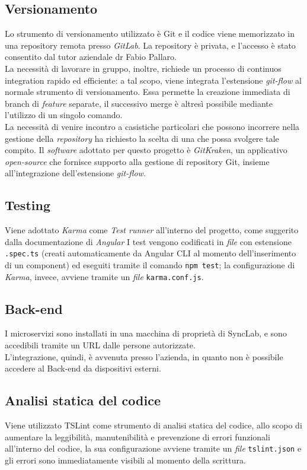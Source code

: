 \subsection{Versionamento}
Lo strumento di versionamento utilizzato è \gls{Git} e il codice viene memorizzato in una \gls{repository} remota presso \textit{GitLab}. La repository è privata, e l'accesso è stato consentito dal tutor aziendale dr Fabio Pallaro.\\
La necessità di lavorare in gruppo, inoltre, richiede un processo di \gls{continuos integration} rapido ed efficiente: a tal scopo, viene integrata l'estensione \textit{git-flow}  al normale strumento di versionamento. Essa permette la creazione immediata di \gls{branch} di \textit{feature} separate, il successivo \gls{merge} è altresì possibile mediante l'utilizzo di un singolo comando.\\
La necessità di venire incontro a casistiche particolari che possono incorrere nella gestione della \textit{repository} ha richiesto la scelta di una  che possa svolgere tale compito. Il \textit{software} adottato per questo progetto è \textit{GitKraken}, un applicativo \textit{open-source} che fornisce  supporto alla gestione di repository \gls{Git}, insieme all'integrazione dell'estensione \textit{git-flow}.

\subsection{Testing}
Viene adottato \textit{Karma} come \textit{Test runner} all'interno del progetto, come suggerito dalla documentazione di \textit{Angular}
I test vengono codificati in \textit{file} con estensione \texttt{.spec.ts} (creati automaticamente da Angular CLI al momento dell'inserimento di un component) ed eseguiti tramite il comando \texttt{npm test}; la configurazione di \textit{Karma}, invece, avviene tramite un \textit{file} \texttt{karma.conf.js}.

\subsection{Back-end}
I microservizi sono installati in una macchina di proprietà di SyncLab, e sono accedibili tramite un URL dalle persone autorizzate.\\
L'integrazione, quindi, è avvenuta presso l'azienda, in quanto non è possibile accedere al \gls{Back-end} da dispositivi esterni.

\subsection{Analisi statica del codice} \label{tslint}
Viene utilizzato TSLint come strumento di analisi statica del codice, allo scopo di aumentare la leggibilità, manutenibilità e prevenzione di errori funzionali all'interno del codice, la sua configurazione avviene tramite un \textit{file} \texttt{tslint.json} e gli errori sono immediatamente visibili al momento della scrittura.

